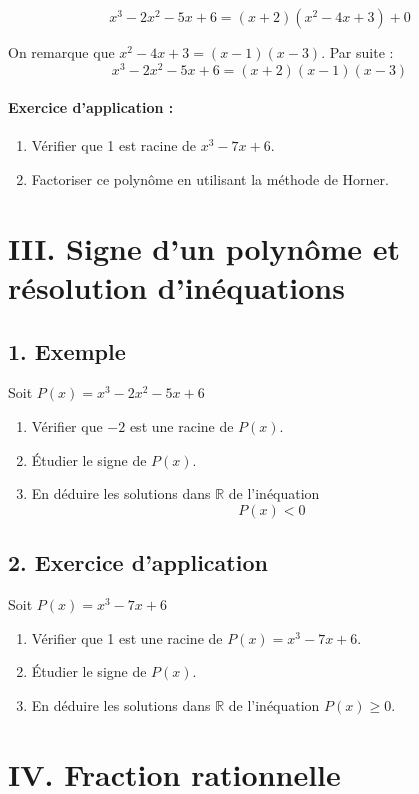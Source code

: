 \documentclass[12pt,a4paper]{article}
\newcounter{solution}
\newcounter{remarque}
\begin{document}
\[
x^3 - 2x^2 - 5x + 6 = (x + 2)(x^2 - 4x + 3) + 0
\]

On remarque que \( x^2 - 4x + 3 = (x - 1)(x - 3) \). Par suite :
\[
x^3 - 2x^2 - 5x + 6 = (x + 2)(x - 1)(x - 3)
\]

\paragraph{Exercice d'application :}
\begin{enumerate}
    \item Vérifier que 1 est racine de \( x^3 - 7x + 6 \).
    \item Factoriser ce polynôme en utilisant la méthode de Horner.
\end{enumerate}

\section*{III. Signe d'un polynôme et résolution d'inéquations}

\subsection*{1. Exemple}
Soit \(P(x)= x^3 - 2x^2 - 5x + 6 \)

\begin{enumerate}
    \item Vérifier que \(-2\) est une racine de \( P(x) \).
    \item Étudier le signe de \( P(x) \).
    \item En déduire les solutions dans \( \mathbb{R} \) de l'inéquation
    \[
    P(x) < 0
    \]
\end{enumerate}

\subsection*{2. Exercice d'application}
Soit \( P(x)=x^3 - 7x + 6 \)
\begin{enumerate}
    \item Vérifier que 1 est une racine de \( P(x)=x^3 - 7x + 6 \).
    \item Étudier le signe de \( P(x)\).
    \item En déduire les solutions dans \( \mathbb{R} \) de l'inéquation
    \( P(x) \geq 0 \).
\end{enumerate}

\section*{IV. Fraction rationnelle}
\end{document}
